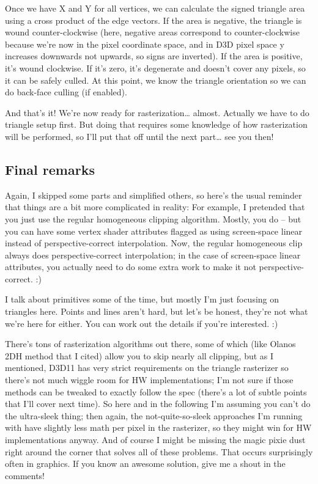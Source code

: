 \documentclass[12pt]{article}
\begin{document}
Once we have X and Y for all vertices, we can calculate the signed triangle area using a cross product of the edge vectors. If the area is negative, the triangle is wound counter-clockwise (here, negative areas correspond to counter-clockwise because we’re now in the pixel coordinate space, and in D3D pixel space y increases downwards not upwards, so signs are inverted). If the area is positive, it’s wound clockwise. If it’s zero, it’s degenerate and doesn’t cover any pixels, so it can be safely culled. At this point, we know the triangle orientation so we can do back-face culling (if enabled).

And that’s it! We’re now ready for rasterization… almost. Actually we have to do triangle setup first. But doing that requires some knowledge of how rasterization will be performed, so I’ll put that off until the next part… see you then!

\subsection{Final remarks}
\label{sec:orgb112927}

Again, I skipped some parts and simplified others, so here’s the usual reminder that things are a bit more complicated in reality: For example, I pretended that you just use the regular homogeneous clipping algorithm. Mostly, you do – but you can have some vertex shader attributes flagged as using screen-space linear instead of perspective-correct interpolation. Now, the regular homogeneous clip always does perspective-correct interpolation; in the case of screen-space linear attributes, you actually need to do some extra work to make it not perspective-correct. :)

I talk about primitives some of the time, but mostly I’m just focusing on triangles here. Points and lines aren’t hard, but let’s be honest, they’re not what we’re here for either. You can work out the details if you’re interested. :)

There’s tons of rasterization algorithms out there, some of which (like Olanos 2DH method that I cited) allow you to skip nearly all clipping, but as I mentioned, D3D11 has very strict requirements on the triangle rasterizer so there’s not much wiggle room for HW implementations; I’m not sure if those methods can be tweaked to exactly follow the spec (there’s a lot of subtle points that I’ll cover next time). So here and in the following I’m assuming you can’t do the ultra-sleek thing; then again, the not-quite-so-sleek approaches I’m running with have slightly less math per pixel in the rasterizer, so they might win for HW implementations anyway. And of course I might be missing the magic pixie dust right around the corner that solves all of these problems. That occurs surprisingly often in graphics. If you know an awesome solution, give me a shout in the comments!
\end{document}
